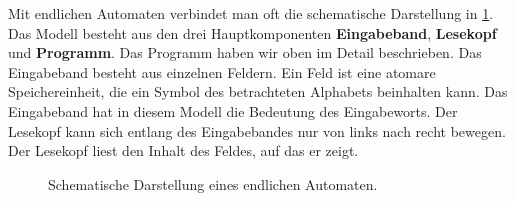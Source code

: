 Mit endlichen Automaten verbindet man oft die schematische Darstellung in \cref{fig:EA_schema}. Das Modell besteht aus den drei Hauptkomponenten \textbf{Eingabeband}, \textbf{Lesekopf} und \textbf{Programm}. Das Programm haben wir oben im Detail beschrieben. Das Eingabeband besteht aus einzelnen Feldern. Ein Feld ist eine atomare Speichereinheit, die ein Symbol des betrachteten Alphabets beinhalten kann. Das Eingabeband hat in diesem Modell die Bedeutung des Eingabeworts. Der Lesekopf kann sich entlang des Eingabebandes nur von links nach recht bewegen. Der Lesekopf liest den Inhalt des Feldes, auf das er zeigt.
\begin{figure}[H]
	\centering
	\caption{Schematische Darstellung eines endlichen Automaten.}
	\label{fig:EA_schema}
\end{figure}

